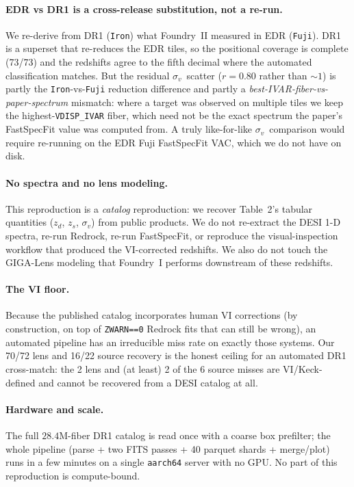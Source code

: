 \documentclass[11pt,letterpaper]{article}
\newcommand{\sigmav}{\ensuremath{\sigma_v}}
\newcommand{\zd}{\ensuremath{z_d}}
\newcommand{\zs}{\ensuremath{z_s}}
\begin{document}
\paragraph{EDR vs DR1 is a cross-release substitution, not a re-run.}
We re-derive from DR1 (\texttt{Iron}) what Foundry~II measured in EDR
(\texttt{Fuji}). DR1 is a superset that re-reduces the EDR tiles, so the
positional coverage is complete (73/73) and the redshifts agree to the
fifth decimal where the automated classification matches. But the residual
\sigmav\ scatter ($r=0.80$ rather than $\sim1$) is partly the
\texttt{Iron}-vs-\texttt{Fuji} reduction difference and partly a
\emph{best-IVAR-fiber-vs-paper-spectrum} mismatch: where a target was observed
on multiple tiles we keep the highest-\texttt{VDISP\_IVAR} fiber, which need not
be the exact spectrum the paper's FastSpecFit value was computed from. A truly
like-for-like \sigmav\ comparison would require re-running on the EDR Fuji
FastSpecFit VAC, which we do not have on disk.

\paragraph{No spectra and no lens modeling.}
This reproduction is a \emph{catalog} reproduction: we recover Table~2's
tabular quantities (\zd, \zs, \sigmav) from public products. We do not
re-extract the DESI 1-D spectra, re-run Redrock, re-run FastSpecFit, or
reproduce the visual-inspection workflow that produced the VI-corrected
redshifts. We also do not touch the GIGA-Lens modeling that Foundry~I performs
downstream of these redshifts.

\paragraph{The VI floor.}
Because the published catalog incorporates human VI corrections (by
construction, on top of \texttt{ZWARN==0} Redrock fits that can still be wrong),
an automated pipeline has an irreducible miss rate on exactly those systems.
Our 70/72 lens and 16/22 source recovery is the honest ceiling for an
automated DR1 cross-match: the 2 lens and (at least) 2 of the 6 source misses
are VI/Keck-defined and cannot be recovered from a DESI catalog at all.

\paragraph{Hardware and scale.}
The full $28.4$M-fiber DR1 catalog is read once with a coarse box prefilter; the
whole pipeline (parse + two FITS passes + 40 parquet shards + merge/plot) runs
in a few minutes on a single \texttt{aarch64} server with no GPU. No part of
this reproduction is compute-bound.
\end{document}
